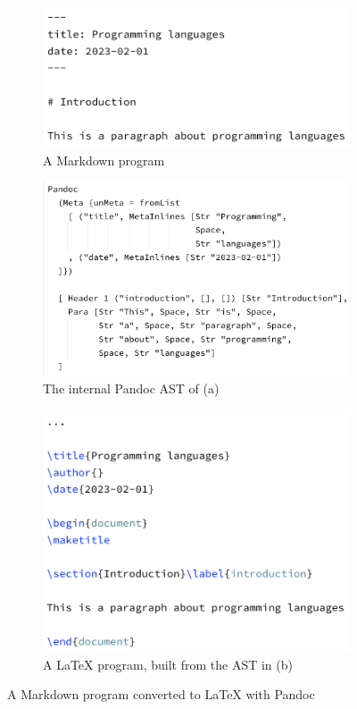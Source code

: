 \begin{figure}[ht]
\centering
\begin{subfigure}{.6\textwidth}
  \centering
  \includegraphics[width=1\linewidth]{assets/pandocMD.png}
  \caption{A Markdown program}
  \label{fig:a}
\end{subfigure}
\begin{subfigure}{.6\textwidth}
  \centering
  \includegraphics[width=1\linewidth]{assets/pandocHASKELL.png}
  \caption{The internal Pandoc AST of (a)}
  \label{fig:b}
\end{subfigure}
\begin{subfigure}{.6\textwidth}
  \centering
  \includegraphics[width=1\linewidth]{assets/pandocLATEX.png}
  \caption{A LaTeX program, built from the AST in (b)}
  \label{fig:c}
\end{subfigure}

\caption{A Markdown program converted to LaTeX with Pandoc}
\label{fig:d}
\end{figure}